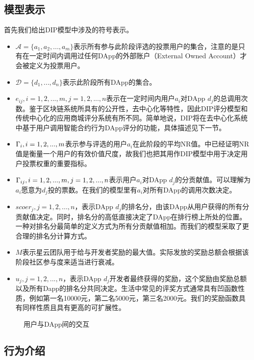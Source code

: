 \subsection{模型表示}
首先我们给出DIP模型中涉及的符号表示。
\begin{itemize}
	\item $\mathcal{A}=\{a_1,a_2,...,a_m\}$表示所有参与此阶段评选的投票用户的集合，注意的是只有在一定时间内调用过任何DApp的外部账户（External Owned Account）才会被定义为投票用户。
	\item $\mathcal{D}=\{d_1,...,d_n\}$表示此阶段所有DApp的集合。
	\item $e_{ij},i=1,2,...,m, j=1,2,...,n$表示在一定时间内用户$a_i$对DApp $d_j$的总调用次数。鉴于区块链系统所具有的公开性，去中心化等特性，因此DIP评分模型和传统中心化的应用商城评分系统有所不同。简单地说，DIP将在去中心化系统中基于用户调用智能合约行为DApp评分的功能，具体描述见下一节。
	\item $\Gamma_i, i=1,2,...,m$表示参与评选的用户$a_i$在此阶段的平均NR值。\cite{Nabulasyellowpaper}中已经证明NR值是衡量一个用户的有效价值尺度，故我们也把其用作DIP模型中用于决定用户投票权重的重要指标。
	\item $\Gamma_{ij}, i=1,2,...,m,j=1,2,...,n$表示用户$a_i$对DApp $d_j$的分贡献值。可以理解为$a_i$愿意为$d_j$投的票数。在我们的模型里有$a_i$对所有DApp的调用次数决定。
	\item $scoer_j, j=1,2,...,n$，表示DApp $d_j$的排名分，由该DApp从用户获得的所有分贡献值决定。同时，排名分的高低直接决定了DApp在排行榜上所处的位置。一种对排名分最简单的定义方式为所有分贡献值相加。而我们的模型采取了更合理的排名分计算方式。
	\item $M$表示星云团队用于给与开发者奖励的最大值。实际发放的奖励总额会根据该阶段社区参与度来适当进行衰减。
	\item $u_j, j=1,2,...,n$，表示DApp $d_j$开发者最终获得的奖励，这个奖励由奖励总额以及所有Dapp的排名分共同决定。生活中常见的评奖方式通常具有凹函数性质，例如第一名10000元，第二名5000元，第三名2000元。我们的奖励函数具有同样性质且具有更高的可扩展性。
\end{itemize}

\begin{figure}
	\centering
  
\caption{用户与DApp间的交互 \label{fig:interact}}
\end{figure}
\subsection{行为介绍}

